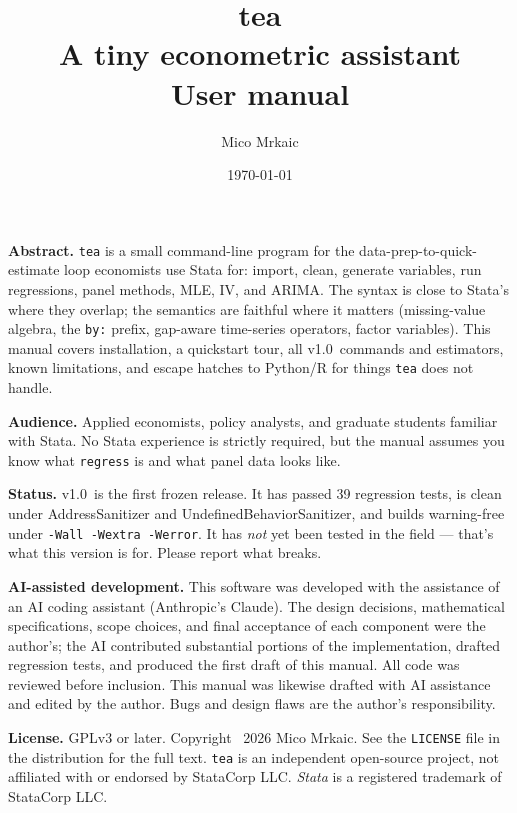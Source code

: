 \documentclass[11pt,letterpaper]{article}
\title{\textbf{\Huge tea \teaversion}\\[0.5em]\Large A tiny econometric assistant\\[0.3em]\large User manual}
\author{Mico Mrkaic}
\date{\today}
\newcommand{\teaversion}{1.0}
\begin{document}
\thispagestyle{empty}
\maketitle

\vspace{2em}
\begin{center}
\begin{minipage}{0.85\textwidth}
\small
\textbf{Abstract.} \texttt{tea} is a small command-line program for the
data-prep-to-quick-estimate loop economists use Stata for: import, clean,
generate variables, run regressions, panel methods, MLE, IV, and ARIMA.
The syntax is close to Stata's where they overlap; the semantics are
faithful where it matters (missing-value algebra, the \texttt{by:} prefix,
gap-aware time-series operators, factor variables).  This manual covers
installation, a quickstart tour, all v\teaversion\ commands and estimators,
known limitations, and escape hatches to Python/R for things \texttt{tea}
does not handle.

\vspace{1em}
\textbf{Audience.}  Applied economists, policy analysts, and graduate
students familiar with Stata.  No Stata experience is strictly required,
but the manual assumes you know what \texttt{regress} is and what panel
data looks like.

\vspace{1em}
\textbf{Status.}  v\teaversion\ is the first frozen release.  It has
passed 39 regression tests, is clean under AddressSanitizer and
UndefinedBehaviorSanitizer, and builds warning-free under
\texttt{-Wall -Wextra -Werror}.  It has \emph{not} yet been tested in
the field --- that's what this version is for.  Please report what breaks.

\vspace{1em}
\textbf{AI-assisted development.}  This software was developed with the
assistance of an AI coding assistant (Anthropic's Claude).  The design
decisions, mathematical specifications, scope choices, and final
acceptance of each component were the author's; the AI contributed
substantial portions of the implementation, drafted regression tests,
and produced the first draft of this manual.  All code was reviewed
before inclusion.  This manual was likewise drafted with AI assistance
and edited by the author.  Bugs and design flaws are the author's
responsibility.

\vspace{1em}
\textbf{License.}  GPLv3 or later.  Copyright \textcopyright\ 2026
Mico Mrkaic.  See the \texttt{LICENSE} file in the distribution for
the full text.  \texttt{tea} is an independent open-source project,
not affiliated with or endorsed by StataCorp LLC.
\textit{Stata} is a registered trademark of StataCorp LLC.
\end{minipage}
\end{center}
\end{document}

